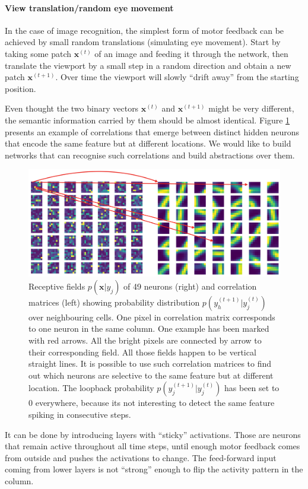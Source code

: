 \documentclass[12pt]{article}
\begin{document}
\paragraph{View translation/random eye movement} 

 In the case of image recognition, the simplest form of motor feedback can be achieved by small random translations (simulating eye movement). Start by taking some patch $\boldsymbol{x}^{(t)}$ of an image and feeding it through the network, then translate the viewport by a small step in a random direction and obtain a new patch $\boldsymbol{x}^{(t+1)}$. Over time the viewport will slowly ``drift away'' from the starting position.

Even thought the two binary vectors $\boldsymbol{x}^{(t)}$ and $\boldsymbol{x}^{(t+1)}$ might be very different, the semantic information carried by them should be almost identical. Figure \ref{fig:motor_drift} presents an example of correlations that emerge between distinct hidden neurons that encode the same feature but at different locations. We would like to build networks that can recognise such correlations and build abstractions over them. 
\begin{figure}[!htbp]
	\centering
	\includegraphics[width=13.8cm]{motor_drift}
	\caption{Receptive fields $p(\boldsymbol{x}|y_j)$ of 49 neurons (right) and correlation matrices (left) showing probability distribution $p(y_h^{(t+1)}|y_j^{(t)})$ over neighbouring cells. One pixel in correlation matrix corresponds to one neuron in the same column. One example has been marked with red arrows. All the bright pixels are connected by arrow to their corresponding field. All those fields happen to be vertical straight lines. It is possible to use such correlation matrices to find out which neurons are selective to the same feature but at different location. The loopback probability $p(y_j^{(t+1)}|y_j^{(t)})$ has been set to $0$ everywhere, because its not interesting to detect the same feature spiking in consecutive steps.}
	\label{fig:motor_drift}
\end{figure} 
It can be done by introducing layers with ``sticky'' activations. Those are neurons that remain active throughout all time steps, until enough motor feedback comes from outside and pushes the activations to change. The feed-forward input coming from lower layers is not ``strong'' enough to flip the activity pattern in the column.
\end{document}
